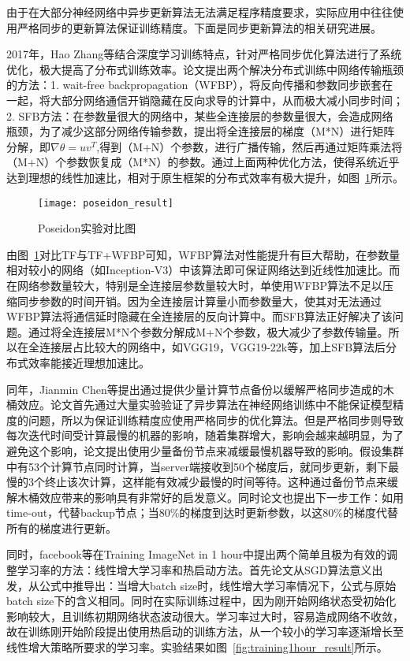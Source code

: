 由于在大部分神经网络中异步更新算法无法满足程序精度要求，实际应用中往往使用严格同步的更新算法保证训练精度。下面是同步更新算法的相关研究进展。

2017年，Hao Zhang等结合深度学习训练特点，针对严格同步优化算法进行了系统优化，极大提高了分布式训练效率。论文提出两个解决分布式训练中网络传输瓶颈的方法：1. wait-free backpropagation（WFBP），将反向传播和参数同步嵌套在一起，将大部分网络通信开销隐藏在反向求导的计算中，从而极大减小同步时间；2. SFB方法：在参数量很大的网络中，某些全连接层的参数量很大，会造成网络瓶颈，为了减少这部分网络传输参数，提出将全连接层的梯度（M*N）进行矩阵分解，即$\nabla\theta=uv^{T}$,得到（M+N）个参数，进行广播传输，然后再通过矩阵乘法将（M+N）个参数恢复成（M*N）的参数。通过上面两种优化方法，使得系统近乎达到理想的线性加速比，相对于原生框架的分布式效率有极大提升，如图~\ref{fig:poseidon_result}所示。

\begin{figure}[htp]
\centering
\texttt{[image: poseidon\_result]}
\caption{Poseidon实验对比图}
\label{fig:poseidon_result}
\end{figure}
由图~\ref{fig:poseidon_result}对比TF与TF+WFBP可知，WFBP算法对性能提升有巨大帮助，在参数量相对较小的网络（如Inception-V3）中该算法即可保证网络达到近线性加速比。而在网络参数量较大，特别是全连接层参数量较大时，单使用WFBP算法不足以压缩同步参数的时间开销。因为全连接层计算量小而参数量大，使其对无法通过WFBP算法将通信延时隐藏在全连接层的反向计算中。而SFB算法正好解决了该问题。通过将全连接层M*N个参数分解成M+N个参数，极大减少了参数传输量。所以在全连接层占比较大的网络中，如VGG19，VGG19-22k等，加上SFB算法后分布式效率能接近理想加速比。

同年，Jianmin Chen等提出通过提供少量计算节点备份以缓解严格同步造成的木桶效应。论文首先通过大量实验验证了异步算法在神经网络训练中不能保证模型精度的问题，所以为保证训练精度应使用严格同步的优化算法。但是严格同步则导致每次迭代时间受计算最慢的机器的影响，随着集群增大，影响会越来越明显，为了避免这个影响，论文提出使用少量备份节点来减缓最慢机器导致的影响。假设集群中有53个计算节点同时计算，当server端接收到50个梯度后，就同步更新，剩下最慢的3个终止该次计算，这样能有效减少最慢的时间等待。这种通过备份节点来缓解木桶效应带来的影响具有非常好的启发意义。同时论文也提出下一步工作：如用time-out，代替backup节点；当80\%的梯度到达时更新参数，以这80\%的梯度代替所有的梯度进行更新。

同时，facebook等在Training ImageNet in 1 hour中提出两个简单且极为有效的调整学习率的方法：线性增大学习率和热启动方法。首先论文从SGD算法意义出发，从公式中推导出：当增大batch size时，线性增大学习率情况下，公式与原始batch size下的含义相同。同时在实际训练过程中，因为刚开始网络状态受初始化影响较大，且训练初期网络状态波动很大。学习率过大时，容易造成网络不收敛，故在训练刚开始阶段提出使用热启动的训练方法，从一个较小的学习率逐渐增长至线性增大策略所要求的学习率。实验结果如图~\ref{fig:training1hour_result}所示。

